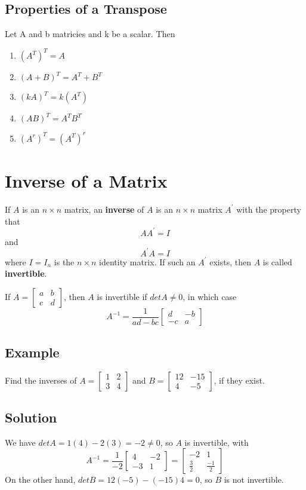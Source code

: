 \subsection*{Properties of a Transpose}
Let A and b matricies and k be a scalar. Then
\begin{enumerate}
    \item $(A^T)^T = A$
    \item $(A+B)^T = A^T + B^T$
    \item $(kA)^T = k(A^T)$
    \item $(AB)^T = A^TB^T$
    \item $(A^r)^T = (A^T)^r$
\end{enumerate}

\section{Inverse of a Matrix}
If $A$ is an $n\times n$ matrix, an \textbf{inverse} of $A$ is an $n\times n$ matrix $A^\prime$ with the property that
$$AA^\prime = I$$ and $$A^\prime A = I$$
where $I = I_n$ is the $n\times n$ identity matrix. If such an $A^\prime$ exists, then $A$ is called \textbf{invertible}.

If $A = \begin{bmatrix}
    a&b\\c&d
\end{bmatrix}$, then $A$ is invertible if $detA\neq 0$, in which case
$$A^{-1} = \frac{1}{ad-bc}\begin{bmatrix}
    d&-b\\-c&a
\end{bmatrix}$$

\subsection*{Example}
Find the inverses of $A = \begin{bmatrix}
    1&2\\3&4
\end{bmatrix}$ and $B = \begin{bmatrix}
    12&-15\\4&-5
\end{bmatrix}$, if they exist. 
\subsection*{Solution}
We have $detA = 1(4) - 2(3) = -2\neq 0$, so $A$ is invertible, with
$$A^{-1} = \frac{1}{-2}\begin{bmatrix}
    4&-2\\-3&1
\end{bmatrix} = \begin{bmatrix}
    -2&1\\\frac{3}{2}&\frac{-1}{2}
\end{bmatrix}$$
On the other hand, $det B = 12(-5) - (-15)4 = 0$, so $B$ is not invertible.

